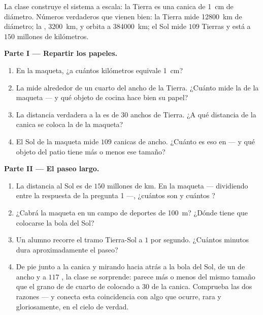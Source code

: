 \begin{problem}\label{pb:g6:sun-earth-moon:1}
La clase construye el sistema a escala: la Tierra es una canica de
\qty{1}{cm} de diámetro. Números verdaderos que vienen bien: la Tierra
mide \qty{12800}{km} de diámetro; la , \qty{3200}{km}, y orbita
a \qty{384000}{km}; el Sol mide $109$ Tierras y está a $150$ millones
de kilómetros.

\medskip\noindent\textbf{Parte I --- Repartir los papeles.}
\begin{enumerate}
  \item En la maqueta, ¿a cuántos kilómetros equivale \qty{1}{cm}?
  \item La  mide alrededor de un cuarto del ancho de la
        Tierra. ¿Cuánto mide la  de la maqueta --- y qué objeto de
        cocina hace bien su papel?
  \item La distancia verdadera a la  es de $30$ anchos de
        Tierra. ¿A qué distancia de la canica se coloca la  de la
        maqueta?
  \item El Sol de la maqueta mide $109$ canicas de ancho. ¿Cuánto es
        eso en  --- y qué objeto del patio tiene más o
        menos ese tamaño?
\end{enumerate}

\medskip\noindent\textbf{Parte II --- El paseo largo.}
\begin{enumerate}[resume]
  \item La distancia al Sol es de $150$ millones de km. En la maqueta
        --- dividiendo entre la respuesta de la pregunta 1 ---,
        ¿cuántos  son y cuántos ?
  \item ¿Cabrá la maqueta en un campo de deportes de \qty{100}{m}?
        ¿Dónde tiene que colocarse la bola del Sol?
  \item Un alumno recorre el tramo Tierra-Sol a $1$  por
        segundo. ¿Cuántos minutos dura aproximadamente el paseo?
  \item De pie junto a la canica y mirando hacia atrás a la bola del
        Sol, de un  de ancho y a $117$ , la clase se
        sorprende: parece más o menos del mismo tamaño que el grano de
         de cuarto de  colocado a $30$
         de la canica. Comprueba las dos razones --- y
        conecta esta coincidencia con algo que ocurre, rara y
        gloriosamente, en el cielo de verdad.
\end{enumerate}


\end{problem}

